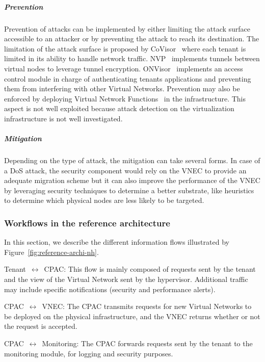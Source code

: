 \subparagraph{Prevention}
Prevention of attacks can be implemented by either limiting the attack surface accessible to an attacker or by preventing the attack to reach its destination. The limitation of the attack surface is proposed by CoVisor~\cite{CoVisor-Jin2015} where each tenant is limited in its ability to handle network traffic.
NVP~\cite{NVP-Koponen2014} implements tunnels between virtual nodes to leverage tunnel encryption.
ONVisor~\cite{ONVisor-Han2018} implements an access control module in charge of authenticating tenants applications and preventing them from interfering with other Virtual Networks.
Prevention may also be enforced by deploying Virtual Network Functions~\cite{vnf} in the infrastructure. This aspect is not well exploited because attack detection on the virtualization infrastructure is not well investigated. 

\subparagraph{Mitigation}
Depending on the type of attack, the mitigation can take several forms. 
In case of a DoS attack, the security component would rely on the VNEC to provide an adequate migration scheme but it can also improve the performance of the VNEC by leveraging security techniques to determine a better substrate, like heuristics to determine which physical nodes are less likely to be targeted. 

\subsubsection{Workflows in the reference architecture}
In this section, we describe the different information flows illustrated by Figure~\ref{fig:reference-archi-nh}.

 Tenant~$\leftrightarrow$~CPAC: This flow is mainly composed of requests sent by the tenant and the view of the Virtual Network sent by the hypervisor. Additional traffic may include specific notifications (\eg security and performance alerts).

 CPAC~$\leftrightarrow$~VNEC: The CPAC transmits requests for new Virtual Networks to be deployed on the physical infrastructure, and the VNEC returns whether or not the request is accepted.

 CPAC~$\leftrightarrow$~Monitoring: The CPAC forwards requests sent by the tenant to the monitoring module, for logging and security purposes. 

